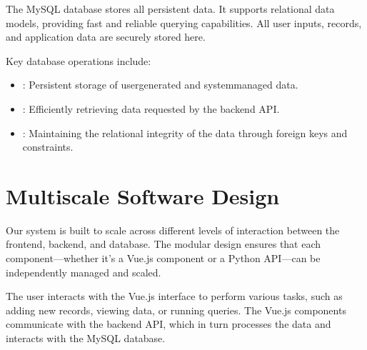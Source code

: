 \documentclass[a4paper,12pt,english]{sphinxmanual}
\begin{document}
\sphinxAtStartPar
The MySQL database stores all persistent data. It supports relational data models, providing fast and reliable querying capabilities. All user inputs, records, and application data are securely stored here.

\sphinxAtStartPar
Key database operations include:
\begin{itemize}
\item {} 
\sphinxAtStartPar
{}: Persistent storage of user\sphinxhyphen{}generated and system\sphinxhyphen{}managed data.

\item {} 
\sphinxAtStartPar
{}: Efficiently retrieving data requested by the back\sphinxhyphen{}end API.

\item {} 
\sphinxAtStartPar
{}: Maintaining the relational integrity of the data through foreign keys and constraints.

\end{itemize}


\section{Multiscale Software Design}
\label{\detokenize{user/overview:multiscale-software-design}}
\sphinxAtStartPar
Our system is built to scale across different levels of interaction between the front\sphinxhyphen{}end, back\sphinxhyphen{}end, and database. The modular design ensures that each component—whether it’s a Vue.js component or a Python API—can be independently managed and scaled.

\sphinxAtStartPar
The user interacts with the Vue.js interface to perform various tasks, such as adding new records, viewing data, or running queries. The Vue.js components communicate with the back\sphinxhyphen{}end API, which in turn processes the data and interacts with the MySQL database.
\end{document}
